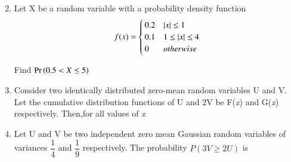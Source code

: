 \documentclass[journal,12pt,twocolumn]{IEEEtran}
\begin{document}
\begin{enumerate}
\begin{enumerate}
\begin{multicols}{4}
\end{multicols}
\end{enumerate}
\solution

\item Let X be a random variable with a probability density function
\begin{align}
f(x) = 
\begin{cases}
0.2 & \abs{x}\leq1
\\
0.1 & 1\leq\abs{x}\leq4
\\
0 & otherwise
\end{cases}
\label{pdf}
\end{align}

Find $\Pr\left(0.5< X \leq 5\right)$
\\
\solution

\item Consider two identically distributed zero-mean random variables U and V. Let the cumulative distribution functions of U and 2V be F(\textit{x}) and G(\textit{x}) respectively. Then,for all values of \textit{x}
\begin{enumerate}
\end{enumerate}
%
\solution

%


\item Let U and V be two independent zero mean Gaussian random variables of variances $\dfrac{1}{4}$ and $\dfrac{1}{9}$ respectively. The probability $P(3V\geqslant2U)$ is
\begin{enumerate}
\end{enumerate}


\end{enumerate}
\end{document}

